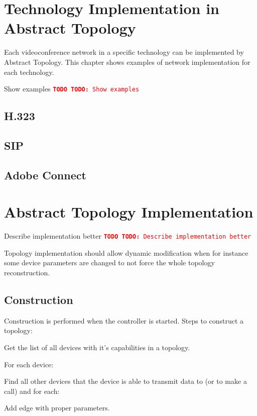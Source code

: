 \documentclass[a4paper]{report}
\newcommand{\TODO}[1]{%
\def\empty{}%
\def\prvniparametr{#1}%
\ifx\prvniparametr\empty%
\begingroup\tt\textcolor{red}{\noindent\textbf{TODO}}\endgroup
\else%
\begingroup\tt\textcolor{red}{\noindent\textbf{TODO:}\ #1}\endgroup
\fi%
}
\begin{document}
\chapter{Technology Implementation in Abstract Topology}
Each videoconference network in a specific technology can be implemented by Abstract Topology. This chapter shows examples of network implementation for each technology.

\TODO{Show examples}

\section{H.323}

\section{SIP}

\section{Adobe Connect}


\chapter{Abstract Topology Implementation}

\TODO{Describe implementation better}

Topology implementation should allow dynamic modification when for instance some device parameters are changed to not force the whole topology reconstruction.      
      
\section{Construction}

Construction is performed when the controller is started. Steps to construct a topology:

\begin{enumerate}

\item Get the list of all devices with it's capabilities in a topology.

\item For each device: 
  \begin{compactitem}
  \item Find all other devices that the device is able to transmit
  data to (or to make a call) and for each:
    \begin{compactitem}
    \item Add edge with proper parameters.
    \end{compactitem}
  \end{compactitem}

\end{enumerate}     
     
\end{document}
